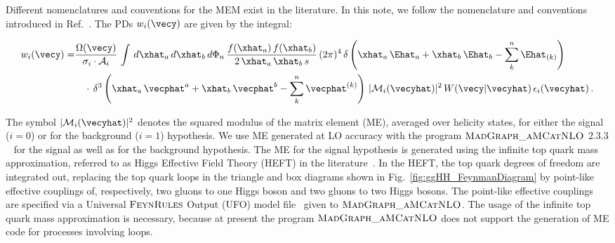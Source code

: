 Different nomenclatures and conventions for the MEM exist in the literature.
In this note, we follow the nomenclature and conventions introduced in Ref.~\cite{Volobouev:2011vb}.
The PDs $w_{i}(\vecy)$ are given by the integral:
\begin{linenowrapper}
\begin{align}
w_{i}(\vecy) = & \frac{\Omega(\vecy)}{\sigma_{i} \cdot \mathcal{A}_{i}} \, \int \, d\xhat_{a} \, d\xhat_{b} \,
  d\Phi_{n} \, \frac{f(\xhat_{a}) \, f(\xhat_{b})}{2 \, \xhat_{a} \, \xhat_{b} \, s} \, (2\pi)^{4} \,
  \delta\left( \xhat_{a} \, \Ehat_{a} + \xhat_{b} \, \Ehat_{b} - \sum_{k}^{n} \Ehat_{(k)} \right) \nonumber \\
 & \quad \cdot \, \delta^{3}\left( \xhat_{a} \, \vecphat^{a} + \xhat_{b} \, \vecphat^{b} - \sum_{k}^{n} \vecphat^{(k)}\right) \, 
  \vert \mathcal{M}_{i}(\vecyhat) \vert^{2} \, W(\vecy|\vecyhat) \, \epsilon_{i}(\vecyhat) \, .
\label{eq:mem1}
\end{align}
\end{linenowrapper}
The symbol $\vert \mathcal{M}_{i}(\vecyhat) \vert^{2}$ denotes the squared modulus of the matrix element (ME),
averaged over helicity states,
for either the signal ($i=0$) or for the background ($i=1$) hypothesis.
We use ME generated at LO accuracy with the program $\textsc{MadGraph\_aMCatNLO}$ $2.3.3$~\cite{MadGraph_aMCatNLO} for the signal as well as for the background hypothesis.
The ME for the signal hypothesis is generated using the infinite top quark mass approximation, referred to as Higgs Effective Field Theory (HEFT) in the literature~\cite{Grinstein:2007iv}.
In the HEFT, the top quark degrees of freedom are integrated out,
replacing the top quark loops in the triangle and box diagrams shown in Fig.~\ref{fig:ggHH_FeynmanDiagram} by point-like effective couplings of, respectively, 
two gluons to one Higgs boson and two gluons to two Higgs bosons.
The point-like effective couplings are specified via a Universal $\textsc{FeynRules}$ Output (UFO) model file~\cite{Degrande:2011ua,Hespel:2014sla} given to $\textsc{MadGraph\_aMCatNLO}$.
The usage of the infinite top quark mass approximation is necessary, because at present the program $\textsc{MadGraph\_aMCatNLO}$ does not support the generation of ME code for processes involving loops.

